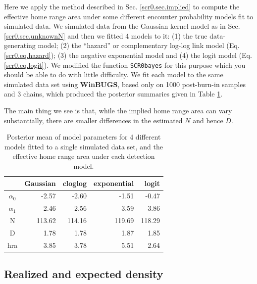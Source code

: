 Here we apply the method described in Sec. \ref{scr0.sec.implied} to
compute the effective home range area under some different encounter
probability models fit to simulated data.  We simulated data from the
Gaussian kernel model as in Sec. \ref{scr0.sec.unknownN} and then we
fitted 4 models to it: (1) the true data-generating model; (2) the
``hazard'' or complementary log-log link model
(Eq. \ref{scr0.eq.hazard}); (3) the negative exponential model and (4)
the logit model (Eq. \ref{scr0.eq.logit}).  We modified the function
\mbox{\tt SCR0bayes} for this purpose which you should be able to do
with little difficulty. We fit each model to the same simulated data
set using {\bf WinBUGS}, based only on 1000 post-burn-in samples and 3
chains, which produced the posterior summaries given in Table
\ref{scr0.tab.implied}.

The main thing we see is that, while the implied home range area can
vary substantially, there
are smaller differences in the estimated $N$ and hence $D$.


\begin{table}
\centering
\caption{
Posterior mean of model parameters for 4 different models fitted to a
single simulated data set,
  and the effective home range area under each detection model.
}
\begin{tabular}{crrrr}
\hline \hline
     &  Gaussian & cloglog &exponential & logit \\  \hline
$\alpha_0$  &  -2.57 &  -2.60 & -1.51 & -0.47 \\
$\alpha_1$  &  2.46  & 2.56  & 3.59  & 3.86 \\
N           & 113.62& 114.16 &119.69& 118.29 \\
D           & 1.78  & 1.78  & 1.87  & 1.85 \\
hra         & 3.85  & 3.78 &  5.51  & 2.64 \\
\hline
\end{tabular}
\label{scr0.tab.implied}
\end{table}


\subsection{Realized and  expected density}

